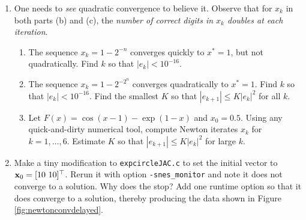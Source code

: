 \renewcommand{\labelenumi}{\arabic{chapter}.\arabic{enumi}\quad}
\renewcommand{\labelenumii}{(\alph{enumii})}
\begin{enumerate}
\item One needs to \emph{see} quadratic convergence to believe it.  Observe that for $x_k$ in both parts (b) and (c), the \emph{number of correct digits in $x_k$ doubles at each iteration}.
    \begin{enumerate}
    \item The sequence $x_k = 1-2^{-n}$ converges quickly to $x^*=1$, but not quadratically.  Find $k$ so that $|e_k| < 10^{-16}$.
    \item The sequence $x_k = 1-2^{-2^n}$ converges quadratically to $x^*=1$.  Find $k$ so that $|e_k| < 10^{-16}$.  Find the smallest $K$ so that $|e_{k+1}| \le K |e_k|^2$ for all $k$.
    \item Let $F(x) = \cos(x-1) - \exp(1-x)$ and $x_0=0.5$.  Using any quick-and-dirty numerical tool, compute Newton iterates $x_k$ for $k=1,\dots,6$.  Estimate $K$ so that $|e_{k+1}| \le K |e_k|^2$ for large $k$.
    \end{enumerate}

\item Make a tiny modification to \texttt{expcircleJAC.c} to set the initial vector to $\mathbf{x}_0 = [10\,\, 10]^\top$.  Rerun it with option \texttt{-snes\_monitor} and note it does not converge to a solution.  Why does the \pSNES stop?  Add one runtime option so that it does converge to a solution, thereby producing the data shown in Figure \ref{fig:newtonconvdelayed}.


\end{enumerate}
